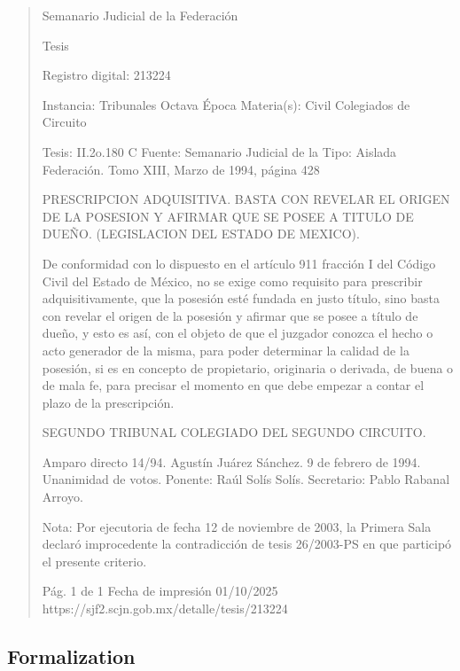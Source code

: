 \documentclass[11pt,a4paper]{article}
\begin{document}
\begin{quote}
                                                   Semanario Judicial de la Federación

                                                  Tesis

 Registro digital: 213224

 Instancia: Tribunales            Octava Época                         Materia(s): Civil
 Colegiados de Circuito

 Tesis: II.2o.180 C               Fuente: Semanario Judicial de la     Tipo: Aislada
                                  Federación.
                                  Tomo XIII, Marzo de 1994, página
                                  428


PRESCRIPCION ADQUISITIVA. BASTA CON REVELAR EL ORIGEN DE LA POSESION Y
AFIRMAR QUE SE POSEE A TITULO DE DUEÑO. (LEGISLACION DEL ESTADO DE MEXICO).


De conformidad con lo dispuesto en el artículo 911 fracción I del Código Civil del Estado de México,
no se exige como requisito para prescribir adquisitivamente, que la posesión esté fundada en justo
título, sino basta con revelar el origen de la posesión y afirmar que se posee a título de dueño, y
esto es así, con el objeto de que el juzgador conozca el hecho o acto generador de la misma, para
poder determinar la calidad de la posesión, si es en concepto de propietario, originaria o derivada,
de buena o de mala fe, para precisar el momento en que debe empezar a contar el plazo de la
prescripción.

SEGUNDO TRIBUNAL COLEGIADO DEL SEGUNDO CIRCUITO.


Amparo directo 14/94. Agustín Juárez Sánchez. 9 de febrero de 1994. Unanimidad de votos.
Ponente: Raúl Solís Solís. Secretario: Pablo Rabanal Arroyo.

Nota: Por ejecutoria de fecha 12 de noviembre de 2003, la Primera Sala declaró improcedente la
contradicción de tesis 26/2003-PS en que participó el presente criterio.




                                             Pág. 1 de 1             Fecha de impresión 01/10/2025
  https://sjf2.scjn.gob.mx/detalle/tesis/213224

\end{quote}

\subsection{Formalization}
\end{document}
